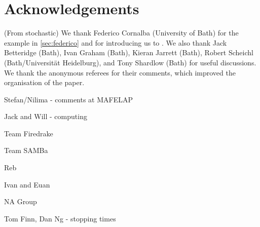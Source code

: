\section*{Acknowledgements}
(From stochastic)
We thank Federico Cornalba (University of Bath) for the example in \cref{sec:federico} and for introducing us to \cite{Si:86}. We also thank Jack Betteridge (Bath), Ivan Graham (Bath),  Kieran Jarrett (Bath), Robert Scheichl (Bath/Universit\"at Heidelburg), and Tony Shardlow (Bath) for useful discussions. We thank the anonymous referees for their comments, which improved the organisation of the paper.


Stefan/Nilima - comments at MAFELAP

Jack and Will - computing

Team Firedrake

Team SAMBa

Reb

Ivan and Euan

NA Group

Tom Finn, Dan Ng - stopping times

